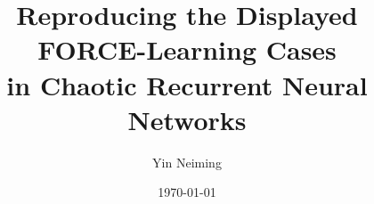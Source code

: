 \title{Reproducing the Displayed FORCE-Learning Cases\\in Chaotic Recurrent Neural Networks}
\author{Yin Neiming}
\date{\today}
